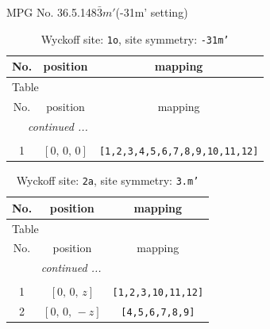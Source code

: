 \documentclass[fleqn,8pt]{jsarticle}
\begin{document}
\setcounter{MaxMatrixCols}{32}

\renewcommand{\tablename}{Table~}
\renewcommand{\figurename}{Figure~}
\begin{center}
\LARGE
MPG No. 36.5.148\quad$\bar{3}m'$\quad(-31m' setting)
\end{center}
\renewcommand{\arraystretch}{1.2}
\begin{longtable}{ccc}
\caption{Wyckoff site: {\tt 1o}, site symmetry: {\tt -31m'}}
 \\
 \hline \hline
No. & position & mapping \\ \hline \endfirsthead

\multicolumn{2}{l}{\tablename\ \thetable{}} \\
 \hline \hline
No. & position & mapping \\ \hline \endhead

 \hline \hline
\multicolumn{2}{r}{\footnotesize\it continued ...} \\ \endfoot

 \hline \hline
\multicolumn{2}{r}{} \\ \endlastfoot

1 & $\left[ 0,\, 0,\, 0 \right]$ & {\tt [1,2,3,4,5,6,7,8,9,10,11,12]} \\
\end{longtable}
\renewcommand{\arraystretch}{1.2}
\begin{longtable}{ccc}
\caption{Wyckoff site: {\tt 2a}, site symmetry: {\tt 3.m'}}
 \\
 \hline \hline
No. & position & mapping \\ \hline \endfirsthead

\multicolumn{2}{l}{\tablename\ \thetable{}} \\
 \hline \hline
No. & position & mapping \\ \hline \endhead

 \hline \hline
\multicolumn{2}{r}{\footnotesize\it continued ...} \\ \endfoot

 \hline \hline
\multicolumn{2}{r}{} \\ \endlastfoot

1 & $\left[ 0,\, 0,\, z \right]$ & {\tt [1,2,3,10,11,12]} \\ \hline
2 & $\left[ 0,\, 0,\, - z \right]$ & {\tt [4,5,6,7,8,9]} \\
\end{longtable}
\renewcommand{\arraystretch}{1.2}
\end{document}
